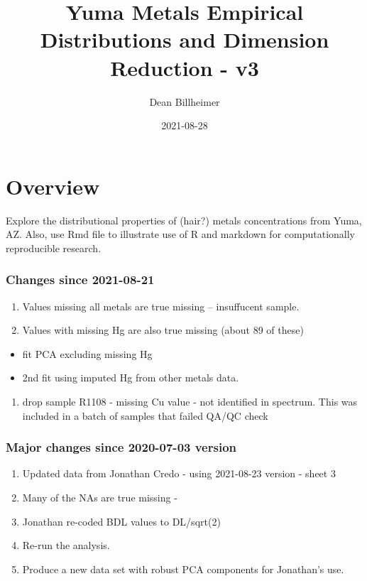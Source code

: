 \documentclass[]{article}
\title{Yuma Metals Empirical Distributions and Dimension Reduction - v3}
\author{Dean Billheimer}
\date{2021-08-28}
\providecommand{\tightlist}{%
  \setlength{\itemsep}{0pt}\setlength{\parskip}{0pt}}
\begin{document}
\maketitle

\hypertarget{overview}{%
\section{Overview}\label{overview}}

Explore the distributional properties of (hair?) metals concentrations
from Yuma, AZ. Also, use Rmd file to illustrate use of R and markdown
for computationally reproducible research.

\hypertarget{changes-since-2021-08-21}{%
\subsubsection{Changes since
2021-08-21}\label{changes-since-2021-08-21}}

\begin{enumerate}
\def\labelenumi{\arabic{enumi}.}
\tightlist
\item
  Values missing all metals are true missing -- insuffucent sample.
\item
  Values with missing Hg are also true missing (about 89 of these)
\end{enumerate}

\begin{itemize}
\tightlist
\item
  fit PCA excluding missing Hg
\item
  2nd fit using imputed Hg from other metals data.
\end{itemize}

\begin{enumerate}
\def\labelenumi{\arabic{enumi}.}
\setcounter{enumi}{2}
\tightlist
\item
  drop sample R1108 - missing Cu value - not identified in spectrum.
  This was included in a batch of samples that failed QA/QC check
\end{enumerate}

\hypertarget{major-changes-since-2020-07-03-version}{%
\subsubsection{Major changes since 2020-07-03
version}\label{major-changes-since-2020-07-03-version}}

\begin{enumerate}
\def\labelenumi{\arabic{enumi}.}
\tightlist
\item
  Updated data from Jonathan Credo - using 2021-08-23 version - sheet 3
\item
  Many of the NAs are true missing -
\item
  Jonathan re-coded BDL values to DL/sqrt(2)
\item
  Re-run the analysis.
\item
  Produce a new data set with robust PCA components for Jonathan's use.
\end{enumerate}
\end{document}
